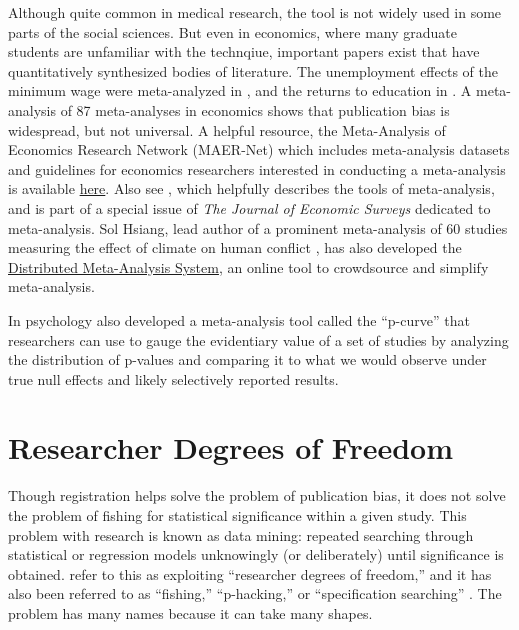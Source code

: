 \documentclass[12pt] {article}
\begin{document}
Although quite common in medical research, the tool is not widely used in some parts of the social sciences. But even in economics, where many graduate students are unfamiliar with the technqiue, important papers exist that have quantitatively synthesized bodies of literature. The unemployment effects of the minimum wage were meta-analyzed in \cite{card1995time}, and the returns to education in \cite{ashenfelter1999review}. A meta-analysis of 87 meta-analyses in economics shows that publication bias is widespread, but not universal. A helpful resource, the Meta-Analysis of Economics Research Network (MAER-Net) which includes meta-analysis datasets and guidelines for economics researchers interested in conducting a meta-analysis is available \href{https://www.hendrix.edu/maer-network/}{here}. Also see \cite{stanley2005beyond}, which helpfully describes the tools of meta-analysis, and is part of a special issue of \textit{The Journal of Economic Surveys} dedicated to meta-analysis. Sol Hsiang, lead author of a prominent meta-analysis of 60 studies measuring the effect of climate on human conflict \citep{hsiang2013climate}, has also developed the \href{http://dmas.berkeley.edu}{Distributed Meta-Analysis System}, an online tool to crowdsource and simplify meta-analysis.

In psychology \cite{simonsohn2014p} also developed a meta-analysis tool called the ``p-curve'' that researchers can use to gauge the evidentiary value of a set of studies by analyzing the distribution of p-values and comparing it to what we would observe under true null effects and likely selectively reported results.

\section{Researcher Degrees of
Freedom}\label{rdof}

Though registration helps solve the problem of publication bias, it does
not solve the problem of fishing for statistical significance within a
given study. This problem with research is known as data mining: repeated searching through statistical or regression
models unknowingly (or deliberately) until significance is obtained.
 \cite{simmons_false-positive_2011} refer to this as exploiting 
``researcher degrees of freedom,'' and it has also been referred to as
``fishing,'' ``p-hacking,'' or ``specification searching'' \citep{humphreys_fishing_2013}. The problem has many names because it can take many shapes. 
\end{document}
